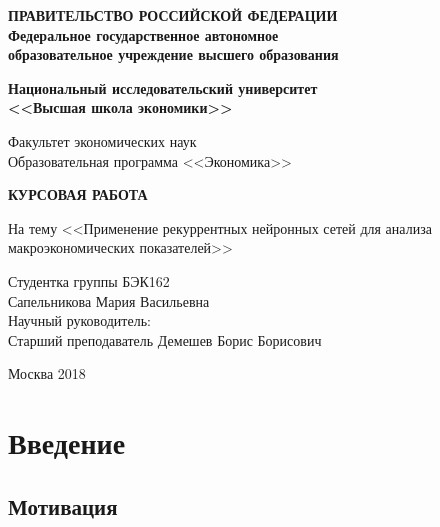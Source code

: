 \documentclass[12pt, a4paper]{article}
\begin{document}
\thispagestyle{empty}
\begin{center}
	\textbf{ПРАВИТЕЛЬСТВО РОССИЙСКОЙ ФЕДЕРАЦИИ}\\
	\vspace{2ex}
	\textbf{Федеральное государственное автономное\\ образовательное учреждение высшего образования}

	\vspace{2ex}

	\textbf{Национальный исследовательский университет \\ <<Высшая школа экономики>>}

	\vspace{8ex}
	\begin{flushright}
	Факультет экономических наук\\
	Образовательная программа <<Экономика>>
	\end{flushright}
\end{center}
\vspace{9ex}

\begin{center}
	{\textbf{КУРСОВАЯ РАБОТА
	}}
	\vspace{1ex}

	На тему <<Применение рекуррентных нейронных сетей для анализа макроэкономических показателей>>
\end{center}
	\vspace{1ex}
\begin{flushright}
	\noindent
	Студентка группы БЭК162\\Сапельникова Мария Васильевна\\
	\vspace{13ex}
	Научный руководитель:\\
	Старший преподаватель Демешев Борис Борисович

\end{flushright}

	\vfill

\begin{center}
		Москва 2018

\end{center}
\newpage
\tableofcontents
\clearpage

\section{Введение}

\subsection{Мотивация}
\end{document}
